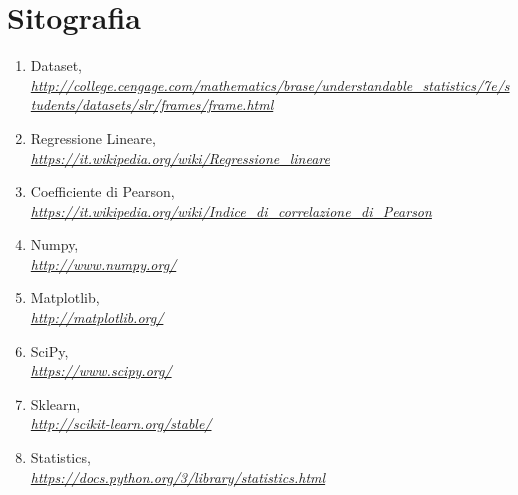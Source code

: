 \documentclass[a4paper,12pt,titlepage,oneside,openany]{book}
\begin{document}
\chapter*{Sitografia}
\begin{enumerate}
	
	\item Dataset,\\ \textit{ \tiny \url{http://college.cengage.com/mathematics/brase/understandable_statistics/7e/students/datasets/slr/frames/frame.html}}
		
	\item Regressione Lineare,\\ \textit{ \scriptsize \url{https://it.wikipedia.org/wiki/Regressione_lineare}}
				
		
	\item Coefficiente di Pearson,\\ \textit{\scriptsize \url{https://it.wikipedia.org/wiki/Indice_di_correlazione_di_Pearson}}
	
	\item Numpy,\\ \textit{\scriptsize \url{http://www.numpy.org/}}

	\item Matplotlib,\\ \textit{\scriptsize \url{http://matplotlib.org/}}

	\item SciPy,\\ \textit{\scriptsize \url{https://www.scipy.org/}}
	
	\item Sklearn,\\ \textit{\scriptsize \url{http://scikit-learn.org/stable/}}
	
	\item Statistics,\\ \textit{\scriptsize \url{https://docs.python.org/3/library/statistics.html}}
	
	
	
\end{enumerate}
\end{document}

